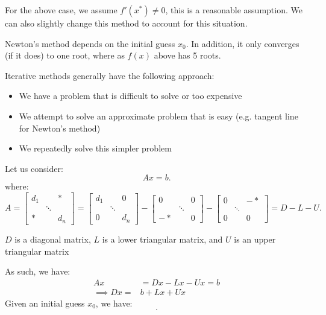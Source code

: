 \documentclass[../main/main.tex]{subfiles}
\begin{document}
\begin{remark}
    For the above case, we assume $f'(x^*) \neq 0$, this is a reasonable assumption. We can also slightly change this method to account for this situation.
\end{remark}
\begin{remark}
    Newton's method depends on the initial guess $x_0$. In addition, it only converges (if it does) to one root, where as $f(x)$ above has 5 roots. 
\end{remark}
\begin{remark}
    Iterative methods generally have the following approach: 
    \begin{itemize}
        \item We have a problem that is difficult to solve or too expensive
        \item We attempt to solve an approximate problem that is easy (e.g. tangent line for Newton's method)
\item We repeatedly solve this simpler problem  
    \end{itemize}
\end{remark}
Let us consider: \[
Ax=b
.\] where: \[
A = \begin{bmatrix} d_1 &  & *\\ & \ddots & \\ * & & d_n \end{bmatrix} =  \begin{bmatrix} d_1 &  & 0\\ & \ddots & \\ 0 & & d_n \end{bmatrix}  -  \begin{bmatrix} 0 &  & 0\\ & \ddots & \\ -* & & 0 \end{bmatrix}  -  \begin{bmatrix} 0 &  & -*\\ & \ddots & \\ 0 & & 0 \end{bmatrix}  = D-L-U
.\] 
\begin{remark}
    $D$ is a diagonal matrix, $L$ is a lower triangular matrix, and  $U$ is an upper triangular matrix
\end{remark}
As such, we have: 
\begin{align*}
    Ax &= Dx - Lx - Ux = b \\
    \implies Dx =& b + Lx + Ux
\end{align*} 
Given an initial guess $x_0$, we have:  \[
.\] 
\end{document}
